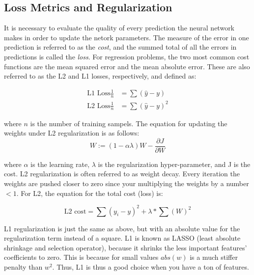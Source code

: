 \subsection{Loss Metrics and Regularization}
It is necessary to evaluate the quality of every prediction the neural network makes in order to update the netork parameters. The measure of the error in one prediction is referred to as the \textit{cost}, and the summed total of all the errors in predictions is called the \textit{loss}. For regression problems, the two most common cost functions are the mean squared error and the mean absolute error. These are also referred to as the L2 and L1 losses, respectively, and defined as:

\begin{align}
    \label{eqn:lossFunctions}
    \text{L1 Loss} \frac{1}{n}&= \sum \left( \hat{y} - y \right) \\
    \text{L2 Loss} \frac{1}{n}&= \sum \left( \hat{y} - y \right)^2
\end{align}

\noindent where $ n $ is the number of training sampels. The equation for updating the weights under L2 regularization is as follows:
\begin{equation}
    W := (1-\alpha \lambda)W - \frac{\partial J}{\partial W}  
\end{equation}

\noindent where $\alpha$ is the learning rate, $\lambda$ is the regularization hyper-parameter, and J is the cost. L2 regularization is often referred to as weight decay. Every iteration the weights are pushed closer to zero since your multiplying the weights by a number $<1$. For L2, the equation for the total cost (loss) is:

\begin{equation}
\text{L2 cost} = \sum (y_i - y)^2 + \lambda * \sum (W)^2
\end{equation}

L1 regularization is just the same as above, but with an absolute value for the regularization term instead of a square. L1 is known as LASSO (least absolute shrinkage and selection operator), because it shrinks the less important features' coefficients to zero. This is because for small values $abs(w)$ is a much stiffer penalty than $w^2$. Thus, L1 is thus a good choice when you have a ton of features.




